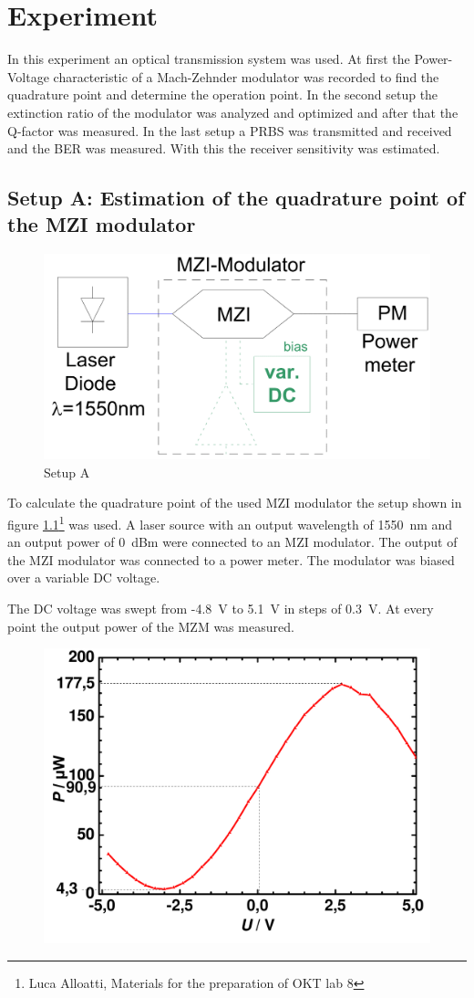 \chapter{Experiment}
In this experiment an optical transmission system was used. At first the Power-Voltage characteristic of a Mach-Zehnder modulator was recorded to find the quadrature point and determine the operation point. In the second setup the extinction ratio of the modulator was analyzed and optimized and after that the Q-factor was measured. In the last setup a PRBS was transmitted and received and the BER was measured. With this the receiver sensitivity was estimated.  

\section{Setup A: Estimation of the quadrature point of the MZI modulator}


\begin{figure}[t]%
\centering
\includegraphics[width=.5\columnwidth]{Grafiken/SetupA.png}%
\caption{Setup A}%
\label{fig:A_setup}%
\end{figure}



To calculate the quadrature point of the used MZI modulator the setup shown in figure \ref{fig:A_setup}\footnote[3]{Luca Alloatti, Materials for the preparation of OKT lab 8} was used. A laser source with an output wavelength of 1550~nm and an output power of 0~dBm were connected to an MZI modulator. The output of the MZI modulator was connected to a power meter. The modulator was biased over a variable DC voltage.

The DC voltage was swept from -4.8~V to 5.1~V in steps of 0.3~V. At every point the output power of the MZM was measured.

\begin{figure}%
\centering
\includegraphics[width=.6\columnwidth]{Grafiken/A_quadratur.pdf}%
\caption{}%
\label{fig:A_quadratur}%
\end{figure}

